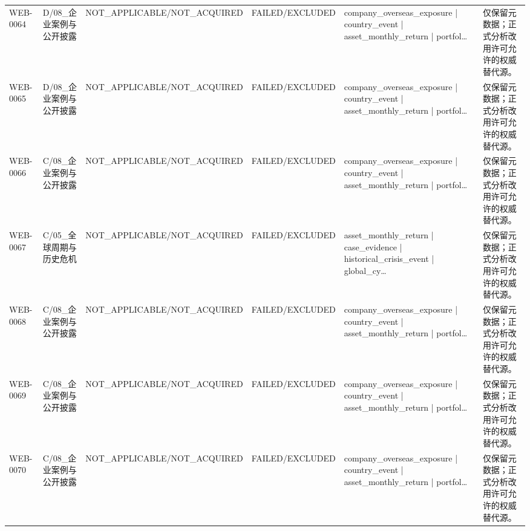 \begin{landscape}
\begin{longtable}{p{1.8cm}p{2.6cm}p{2.6cm}p{2.6cm}p{4.8cm}p{7.2cm}}
WEB-0064 & D/\allowbreak{}08\_\allowbreak{}企业案例与公开披露 & NOT\_\allowbreak{}APPLICABLE/\allowbreak{}NOT\_\allowbreak{}ACQUIRED & FAILED/\allowbreak{}EXCLUDED & company\_\allowbreak{}overseas\_\allowbreak{}exposure | country\_\allowbreak{}event | asset\_\allowbreak{}monthly\_\allowbreak{}return | portfol… & 仅保留元数据；正式分析改用许可允许的权威替代源。\\
WEB-0065 & D/\allowbreak{}08\_\allowbreak{}企业案例与公开披露 & NOT\_\allowbreak{}APPLICABLE/\allowbreak{}NOT\_\allowbreak{}ACQUIRED & FAILED/\allowbreak{}EXCLUDED & company\_\allowbreak{}overseas\_\allowbreak{}exposure | country\_\allowbreak{}event | asset\_\allowbreak{}monthly\_\allowbreak{}return | portfol… & 仅保留元数据；正式分析改用许可允许的权威替代源。\\
WEB-0066 & C/\allowbreak{}08\_\allowbreak{}企业案例与公开披露 & NOT\_\allowbreak{}APPLICABLE/\allowbreak{}NOT\_\allowbreak{}ACQUIRED & FAILED/\allowbreak{}EXCLUDED & company\_\allowbreak{}overseas\_\allowbreak{}exposure | country\_\allowbreak{}event | asset\_\allowbreak{}monthly\_\allowbreak{}return | portfol… & 仅保留元数据；正式分析改用许可允许的权威替代源。\\
WEB-0067 & C/\allowbreak{}05\_\allowbreak{}全球周期与历史危机 & NOT\_\allowbreak{}APPLICABLE/\allowbreak{}NOT\_\allowbreak{}ACQUIRED & FAILED/\allowbreak{}EXCLUDED & asset\_\allowbreak{}monthly\_\allowbreak{}return | case\_\allowbreak{}evidence | historical\_\allowbreak{}crisis\_\allowbreak{}event | global\_\allowbreak{}cy… & 仅保留元数据；正式分析改用许可允许的权威替代源。\\
WEB-0068 & C/\allowbreak{}08\_\allowbreak{}企业案例与公开披露 & NOT\_\allowbreak{}APPLICABLE/\allowbreak{}NOT\_\allowbreak{}ACQUIRED & FAILED/\allowbreak{}EXCLUDED & company\_\allowbreak{}overseas\_\allowbreak{}exposure | country\_\allowbreak{}event | asset\_\allowbreak{}monthly\_\allowbreak{}return | portfol… & 仅保留元数据；正式分析改用许可允许的权威替代源。\\
WEB-0069 & C/\allowbreak{}08\_\allowbreak{}企业案例与公开披露 & NOT\_\allowbreak{}APPLICABLE/\allowbreak{}NOT\_\allowbreak{}ACQUIRED & FAILED/\allowbreak{}EXCLUDED & company\_\allowbreak{}overseas\_\allowbreak{}exposure | country\_\allowbreak{}event | asset\_\allowbreak{}monthly\_\allowbreak{}return | portfol… & 仅保留元数据；正式分析改用许可允许的权威替代源。\\
WEB-0070 & C/\allowbreak{}08\_\allowbreak{}企业案例与公开披露 & NOT\_\allowbreak{}APPLICABLE/\allowbreak{}NOT\_\allowbreak{}ACQUIRED & FAILED/\allowbreak{}EXCLUDED & company\_\allowbreak{}overseas\_\allowbreak{}exposure | country\_\allowbreak{}event | asset\_\allowbreak{}monthly\_\allowbreak{}return | portfol… & 仅保留元数据；正式分析改用许可允许的权威替代源。\\

\end{longtable}
\end{landscape}
